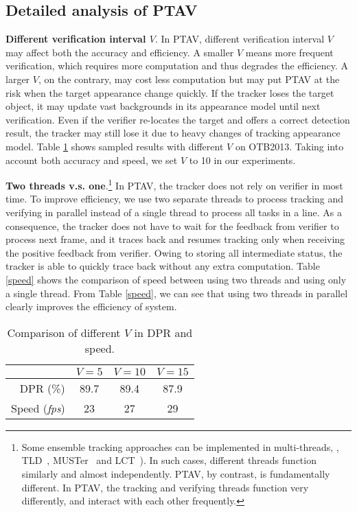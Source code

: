 \documentclass[10pt,twocolumn,letterpaper]{article}
\begin{document}
\subsection{Detailed analysis of PTAV}
\noindent\textbf{Different verification interval $V$}.
In PTAV, different verification interval $V$ may affect both the accuracy and efficiency. A smaller $V$ means more frequent verification, which requires more computation and thus degrades the efficiency. A larger $V$, on the contrary, may cost less computation but may put PTAV at the risk when the target appearance change quickly. If the tracker loses the target object, it may update vast backgrounds in its appearance model until next verification. Even if the verifier re-locates the target and offers a correct detection result, the tracker may still lose it due to heavy changes of tracking appearance model. Table \ref{differentV} shows sampled results with different $V$ on OTB2013. Taking into account both accuracy and speed, we set $V$ to 10 in our experiments.

\vspace{.511mm}\noindent\textbf{Two threads v.s. one}.\footnote{Some ensemble tracking approaches can be implemented in multi-threads, \eg, TLD~\cite{kalal2012tracking}, MUSTer~\cite{hong2015multi} and LCT~\cite{ma2015long}). In such cases, different threads function similarly and almost independently. PTAV, by contrast, is fundamentally different. In PTAV, the tracking and verifying threads function very differently, and interact with each other frequently.}
In PTAV, the tracker does not rely on verifier in most time. To improve efficiency, we use two separate threads to process tracking and verifying in parallel instead of a single thread to process all tasks in a line. As a consequence, the tracker does not have to wait for the feedback from verifier to process next frame, and it traces back and resumes tracking only when receiving the positive feedback from verifier. Owing to storing all intermediate status, the tracker is able to quickly trace back without any extra computation. Table \ref{speed} shows the comparison of speed between using two threads and using only a single thread. From Table \ref{speed}, we can see that using two threads in parallel clearly improves the efficiency of system.

\renewcommand\arraystretch{1.3}
\begin{table}[!t]\footnotesize
  \centering
  \caption{Comparison of different $V$ in DPR and speed.}
    \begin{tabular}{rccc}%
    \hline
          &  $V=5$ & $V=10$ & $V=15$ \\
    \hline%
    DPR (\%) & 89.7    & 89.4    & 87.9 \\
    \hline
    Speed (\textit{fps}) & 23    & 27    & 29 \\
    \hline
    \end{tabular}%
  \label{differentV}%
\end{table}%
\end{document}
